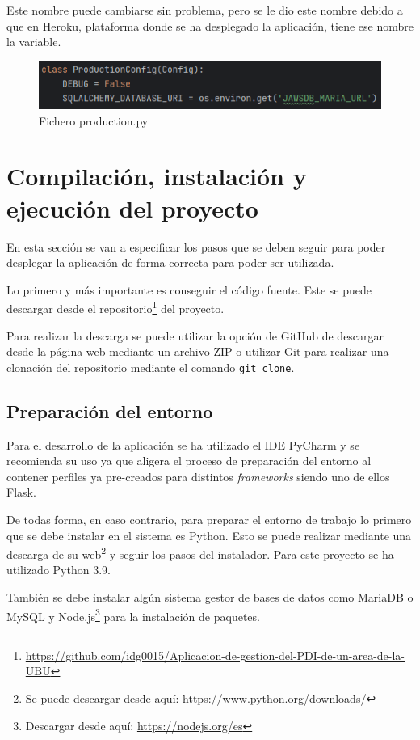 Este nombre puede cambiarse sin problema, pero se le dio este nombre debido a que en Heroku, plataforma donde se ha desplegado la aplicación, tiene ese nombre la variable.

\begin{figure}
	\centering
	\includegraphics[width=\textwidth]{../img/Anexos/ManualProgramador/production.png}
	\caption{Fichero production.py}\label{fig:ficheroProd}
\end{figure}


\section{Compilación, instalación y ejecución del proyecto}
En esta sección se van a especificar los pasos que se deben seguir para poder desplegar la aplicación de forma correcta para poder ser utilizada.

Lo primero y más importante es conseguir el código fuente. 
Este se puede descargar desde el repositorio\footnote{\url{https://github.com/idg0015/Aplicacion-de-gestion-del-PDI-de-un-area-de-la-UBU}} del proyecto.

Para realizar la descarga se puede utilizar la opción de GitHub de descargar desde la página web mediante un archivo ZIP o utilizar Git para realizar una clonación del repositorio mediante el comando \texttt{git clone}.

\subsection{Preparación del entorno}
Para el desarrollo de la aplicación se ha utilizado el IDE PyCharm y se recomienda su uso ya que aligera el proceso de preparación del entorno al contener perfiles ya pre-creados para distintos \textit{frameworks} siendo uno de ellos Flask.

De todas forma, en caso contrario, para preparar el entorno de trabajo lo primero que se debe instalar en el sistema es Python.
Esto se puede realizar mediante una descarga de su web\footnote{Se puede descargar desde aquí: \url{https://www.python.org/downloads/}} y seguir los pasos del instalador. Para este proyecto se ha utilizado Python 3.9.

También se debe instalar algún sistema gestor de bases de datos como MariaDB o MySQL y Node.js\footnote{Descargar desde aquí: \url{https://nodejs.org/es}} para la instalación de paquetes.

